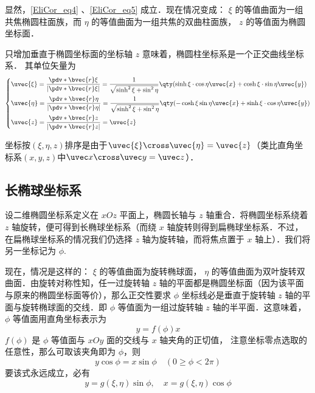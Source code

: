 显然，\autoref{EliCor_eq4} 、\autoref{EliCor_eq5} 成立．现在情况变成： $\xi$ 的等值曲面为一组共焦椭圆柱面族，而 $\eta$ 的等值曲面为一组共焦的双曲柱面族， $z$ 的等值面为椭圆坐标面．

只增加垂直于椭圆坐标面的坐标轴 $z$ 意味着，椭圆柱坐标系是一个正交曲线坐标系． 其单位矢量为
\begin{equation}
\left\{
    \begin{aligned}
    &\uvec{\xi}=\frac{\pdv*{\bvec{r}}{\xi}}{|\pdv*{\bvec{r}}{\xi}|}=\frac{1}{\sqrt{\sinh^2\xi+\sin^2\eta}}\qty(\sinh\xi\cdot\cos\eta\uvec{x}+\cosh\xi\cdot\sin\eta\uvec{y})\\
    &\uvec{\eta }=\frac{\pdv*{\bvec{r}}{\eta}}{|\pdv*{\bvec{r}}{\eta}|}=\frac{1}{\sqrt{\sinh^2\xi+\sin^2\eta}}\qty(-\cosh\xi\sin\eta\uvec{x}+\sinh\xi\cdot\cos\eta\uvec{y})\\
    &\uvec{z}=\frac{\pdv*{\bvec{r}}{z}}{|\pdv*{\bvec{r}}{z}|}=\uvec{z}
    \end{aligned}\right.
\end{equation}

坐标按$(\xi,\eta,z)$排序是由于$\uvec{\xi}\cross\uvec{\eta}=\uvec{z}$（类比直角坐标系$(x,y,z)$中$\uvec x\cross\uvec y=\uvec z$）．
\subsection{长椭球坐标系}
设二维椭圆坐标系定义在 $xOz$ 平面上，椭圆长轴与 $z$ 轴重合．将椭圆坐标系绕着 $z$ 轴旋转，便可得到长椭球坐标系（而绕 $x$ 轴旋转则得到扁椭球坐标系．不过，在扁椭球坐标系的情况我们仍选择 $z$ 轴为旋转轴，而将焦点置于 $x$ 轴上）．我们将另一坐标记为 $\phi$.

现在，情况是这样的： $\xi$ 的等值曲面为旋转椭球面， $\eta$ 的等值曲面为双叶旋转双曲面．由旋转对称性知，任一过旋转轴 $z$ 轴的平面都是椭圆坐标面（因为该平面与原来的椭圆坐标面等价），那么正交性要求 $\phi$ 坐标线必是垂直于旋转轴 $z$ 轴的平面与旋转椭球面的交线．即 $\phi$ 等值面为一组过旋转轴 $z$ 轴的半平面．这意味着， $\phi$ 等值面用直角坐标表示为
\begin{equation}
y=f(\phi)x
\end{equation}
$f(\phi)$ 是 $\phi$ 等值面与 $xOy$ 面的交线与 $x$ 轴夹角的正切值， 注意坐标零点选取的任意性，那么可取该夹角即为 $\phi$，则
\begin{equation}
y\cos\phi = x\sin\phi\quad(0\geq\phi<2\pi)
\end{equation}
要该式永远成立，必有
\begin{equation}\label{EliCor_eq2}
y = g(\xi,\eta)\sin\phi,\quad
x = g(\xi,\eta)\cos\phi
\end{equation}

